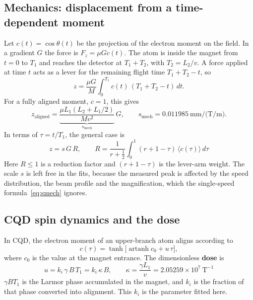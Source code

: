 \documentclass[11pt,a4paper]{article}
\newcommand{\artanh}{\operatorname{artanh}}
\newcommand{\kan}{k_i}
\begin{document}
\subsection{Mechanics: displacement from a time-dependent moment}
\label{sec:mech}
Let $c(t)=\cos\theta(t)$ be the projection of the electron moment on the field. In a gradient $G$ the force is $F_z = \mu G c(t)$. The atom is inside the magnet from $t=0$ to $T_1$ and reaches the detector at $T_1+T_2$, with $T_2 = L_2/v$. A force applied at time $t$ acts as a lever for the remaining flight time $T_1+T_2-t$, so
\begin{equation}
z = \frac{\mu G}{M}\int_0^{T_1} c(t)\,(T_1+T_2-t)\,dt .
\label{eq:zint}
\end{equation}
For a fully aligned moment, $c=1$, this gives
\begin{equation}
z_\text{aligned} = \underbrace{\frac{\mu L_1(L_2+L_1/2)}{Mv^2}}_{s_\text{mech}}\,G,
\qquad s_\text{mech} = 0.011985\ \text{mm/(T/m)} .
\label{eq:smech}
\end{equation}
In terms of $\tau=t/T_1$, the general case is
\begin{equation}
\boxed{\;z = s\,G\,R,\qquad R = \frac{1}{r+\frac12}\int_0^1 (r+1-\tau)\,\langle c(\tau)\rangle\,d\tau\;}
\label{eq:Rdef}
\end{equation}
Here $R\le1$ is a reduction factor and $(r+1-\tau)$ is the lever-arm weight. The scale $s$ is left free in the fits, because the measured peak is affected by the speed distribution, the beam profile and the magnification, which the single-speed formula~\eqref{eq:smech} ignores.

\subsection{CQD spin dynamics and the dose}
In CQD, the electron moment of an upper-branch atom aligns according to
\begin{equation}
c(\tau) = \tanh\!\big[\artanh c_0 + u\,\tau\big],
\label{eq:tanh}
\end{equation}
where $c_0$ is the value at the magnet entrance. The dimensionless \textbf{dose} is
\begin{equation}
\boxed{\;u = \kan\,\gamma\,B\,T_1 = \kan\,\kappa\,B,\qquad \kappa = \frac{\gamma L_1}{v} = 2.05259\times10^7\ \text{T}^{-1}\;}
\label{eq:dose}
\end{equation}
$\gamma BT_1$ is the Larmor phase accumulated in the magnet, and $\kan$ is the fraction of that phase converted into alignment. This $\kan$ is the parameter fitted here.
\end{document}
